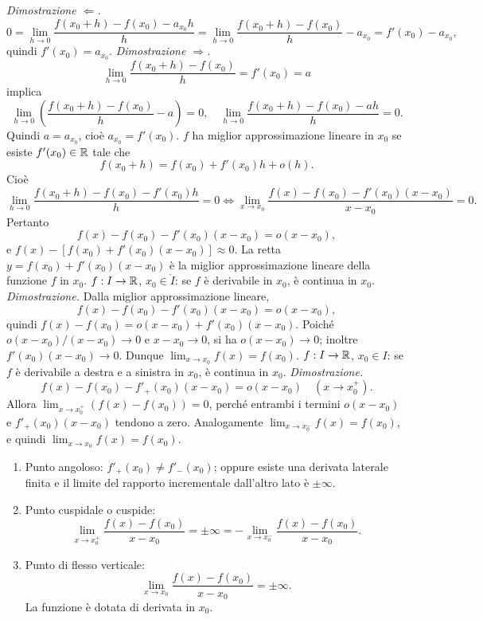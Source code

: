 \textit{Dimostrazione $\Leftarrow$.}
\[
0=\lim_{h\to0}\frac{f(x_0+h)-f(x_0)-a_{x_0}h}h
=\lim_{h\to0}\frac{f(x_0+h)-f(x_0)}h-a_{x_0}=f'(x_0)-a_{x_0},
\]
quindi $f'(x_0)=a_{x_0}$.
\textit{Dimostrazione $\Rightarrow$.}
\[\lim_{h\to0}\frac{f(x_0+h)-f(x_0)}h=f'(x_0)=a\]
implica
\[\lim_{h\to0}\left(\frac{f(x_0+h)-f(x_0)}h-a\right)=0,
\quad\lim_{h\to0}\frac{f(x_0+h)-f(x_0)-ah}h=0.\]
Quindi $a=a_{x_0}$, cioè $a_{x_0}=f'(x_0)$.
$f$ ha miglior approssimazione lineare in $x_0$ se esiste $f'(x_0)\in\mathbb R$ tale che
\[f(x_0+h)=f(x_0)+f'(x_0)h+o(h).\]
Cioè
\[\lim_{h\to0}\frac{f(x_0+h)-f(x_0)-f'(x_0)h}h=0
\iff\lim_{x\to x_0}\frac{f(x)-f(x_0)-f'(x_0)(x-x_0)}{x-x_0}=0.\]
Pertanto
\[f(x)-f(x_0)-f'(x_0)(x-x_0)=o(x-x_0),\]
e $f(x)-[f(x_0)+f'(x_0)(x-x_0)]\approx0$.
La retta $y=f(x_0)+f'(x_0)(x-x_0)$ è la miglior approssimazione lineare della funzione $f$ in $x_0$.
$f:I\to\mathbb R$, $x_0\in\mathring I$: se $f$ è derivabile in $x_0$, è continua in $x_0$.
\textit{Dimostrazione.} Dalla miglior approssimazione lineare,
\[f(x)-f(x_0)-f'(x_0)(x-x_0)=o(x-x_0),\]
quindi $f(x)-f(x_0)=o(x-x_0)+f'(x_0)(x-x_0)$.
Poiché $o(x-x_0)/(x-x_0)\to0$ e $x-x_0\to0$, si ha $o(x-x_0)\to0$; inoltre $f'(x_0)(x-x_0)\to0$.
Dunque $\lim_{x\to x_0}f(x)=f(x_0)$.
$f:I\to\mathbb R$, $x_0\in I$: se $f$ è derivabile a destra e a sinistra in $x_0$, è continua in $x_0$.
\textit{Dimostrazione.}
\[f(x)-f(x_0)-f'_+(x_0)(x-x_0)=o(x-x_0)\quad(x\to x_0^+).\]
Allora $\lim_{x\to x_0^+}(f(x)-f(x_0))=0$, perché entrambi i termini $o(x-x_0)$ e $f'_+(x_0)(x-x_0)$ tendono a zero. Analogamente $\lim_{x\to x_0^-}f(x)=f(x_0)$, e quindi $\lim_{x\to x_0}f(x)=f(x_0)$.
\begin{enumerate}
\item Punto angoloso: $f'_+(x_0)\ne f'_-(x_0)$; oppure esiste una derivata laterale finita e il limite del rapporto incrementale dall'altro lato è $\pm\infty$.
\item Punto cuspidale o cuspide:
\[\lim_{x\to x_0^+}\frac{f(x)-f(x_0)}{x-x_0}=\pm\infty=-\lim_{x\to x_0^-}\frac{f(x)-f(x_0)}{x-x_0}.\]
\item Punto di flesso verticale:
\[\lim_{x\to x_0}\frac{f(x)-f(x_0)}{x-x_0}=\pm\infty.\]
La funzione è dotata di derivata in $x_0$.
\end{enumerate}
